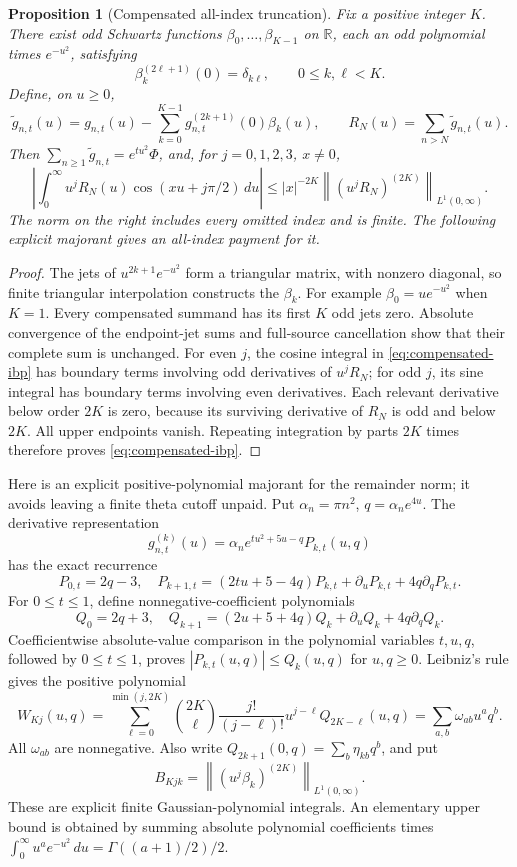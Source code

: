 \documentclass[11pt]{article}
\numberwithin{equation}{section}
\newtheorem{proposition}[theorem]{Proposition}
\theoremstyle{definition}
\theoremstyle{remark}
\begin{document}
\begin{proposition}[Compensated all-index truncation]
\label{prop:compensated-tails}
Fix a positive integer \(K\).  There exist odd Schwartz functions
\(\beta_0,\ldots,\beta_{K-1}\) on \(\mathbb R\), each an odd
polynomial times \(e^{-u^2}\), satisfying
\[
 \beta_k^{(2\ell+1)}(0)=\delta_{k\ell},\qquad 0\leq k,\ell<K.
\]
Define, on \(u\geq0\),
\[
 \widetilde g_{n,t}(u)=g_{n,t}(u)
 -\sum_{k=0}^{K-1}g_{n,t}^{(2k+1)}(0)\beta_k(u),
 \qquad
 R_N(u)=\sum_{n>N}\widetilde g_{n,t}(u).
\]
Then
\(\sum_{n\geq1}\widetilde g_{n,t}=e^{tu^2}\Phi\), and, for
\(j=0,1,2,3\), \(x\ne0\),
\begin{equation}
 \left|\int_0^\infty u^jR_N(u)\cos(xu+j\pi/2)\,du\right|
 \leq |x|^{-2K}\left\|(u^jR_N)^{(2K)}\right\|_{L^1(0,\infty)}.
 \label{eq:compensated-ibp}
\end{equation}
The norm on the right includes every omitted index and is finite.
The following explicit majorant gives an all-index payment for it.
\end{proposition}

\begin{proof}
The jets of \(u^{2k+1}e^{-u^2}\) form a triangular matrix, with
nonzero diagonal, so finite triangular interpolation constructs
the \(\beta_k\).  For example \(\beta_0=ue^{-u^2}\) when \(K=1\).
Every compensated summand has its first \(K\) odd jets zero.
Absolute convergence of the endpoint-jet sums and full-source
cancellation show that their complete sum is unchanged.
For even \(j\), the cosine integral in \eqref{eq:compensated-ibp}
has boundary terms involving odd derivatives of \(u^jR_N\);
for odd \(j\), its sine integral has boundary terms involving even
derivatives.  Each relevant derivative below order \(2K\) is zero,
because its surviving derivative of \(R_N\) is odd and below \(2K\).
All upper endpoints vanish.  Repeating integration by parts \(2K\)
times therefore proves \eqref{eq:compensated-ibp}.
\end{proof}

Here is an explicit positive-polynomial majorant for the remainder norm;
it avoids leaving a finite theta cutoff unpaid.
Put \(\alpha_n=\pi n^2\), \(q=\alpha_ne^{4u}\).
The derivative representation
\[
 g_{n,t}^{(k)}(u)=
 \alpha_ne^{tu^2+5u-q}P_{k,t}(u,q)
\]
has the exact recurrence
\[
 P_{0,t}=2q-3,\quad
 P_{k+1,t}=(2tu+5-4q)P_{k,t}
 +\partial_uP_{k,t}+4q\partial_qP_{k,t}.
\]
For \(0\leq t\leq1\), define nonnegative-coefficient polynomials
\[
 Q_0=2q+3,\quad
 Q_{k+1}=(2u+5+4q)Q_k+\partial_uQ_k+4q\partial_qQ_k.
\]
Coefficientwise absolute-value comparison in the polynomial variables
\(t,u,q\), followed by \(0\leq t\leq1\), proves
\(|P_{k,t}(u,q)|\leq Q_k(u,q)\) for \(u,q\geq0\).
Leibniz's rule gives the positive polynomial
\[
 W_{Kj}(u,q)=
 \sum_{\ell=0}^{\min(j,2K)}
 \binom{2K}{\ell}\frac{j!}{(j-\ell)!}
 u^{j-\ell}Q_{2K-\ell}(u,q)
 =\sum_{a,b}\omega_{ab}u^aq^b .
\]
All \(\omega_{ab}\) are nonnegative.  Also write
\(Q_{2k+1}(0,q)=\sum_b\eta_{kb}q^b\), and put
\[
 B_{Kjk}=\left\|(u^j\beta_k)^{(2K)}\right\|_{L^1(0,\infty)}.
\]
These are explicit finite Gaussian-polynomial integrals.  An elementary
upper bound is obtained by summing absolute polynomial coefficients
times
\(\int_0^\infty u^ae^{-u^2}\,du=\Gamma((a+1)/2)/2\).
\end{document}
